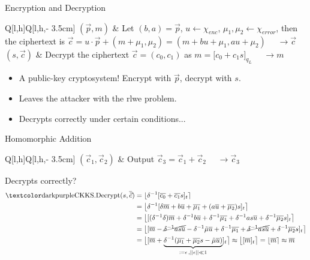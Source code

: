 \begin{frame}{Encryption and Decryption}
   \\
  \begin{tblr}{Q[l,h]Q[l,h,\textwidth - 3.5cm]}
    $(\vec{p}, m)$ & {
        Let $(b,a) = \vec{p}$, $u \leftarrow \chi_{enc}$, $\mu_1, \mu_2 \leftarrow \chi_{error}$,
        then the ciphertext is $\vec{c} = u \cdot \vec{p} + (m + \mu_1, \mu_2) = (m + bu + \mu_1, au + \mu_2)$
        $\quad\rightarrow \vec{c}$} \\
    $(s, \vec{c})$ & {
        Decrypt the ciphertext $\vec{c} = (c_0, c_1)$ as $m = \lbrack c_0 + c_1 s\rbrack_{q_L}$
        $\quad\rightarrow m$} \\
  \end{tblr}
  \begin{itemize}
    \item A public-key cryptosystem! Encrypt with $\vec{p}$, decrypt with $s$.
    \item Leaves the attacker with the \gls{rlwe} problem.
    \item Decrypts correctly under certain conditions...
  \end{itemize}
\end{frame}

\begin{frame}{Homomorphic Addition}
  \begin{tblr}{Q[l,h]Q[l,h,\textwidth - 3.5cm]}
    $(\vec{c}_1, \vec{c}_2)$ & {
        Output $\vec{c}_3 = \vec{c}_1 + \vec{c}_2$
        $\quad\rightarrow \vec{c}_3$} \\
  \end{tblr}

  Decrypts correctly?
  \begin{align*}
    \cryptop{CKKS.Decrypt}(s, \overline{\vec{c}})
     & = \lfloor \delta\inv [\overline{c_0} + \overline{c_1} s]_t \rceil                                                                                                                                                         \\
     & = \big\lfloor \delta\inv [\delta \overline{m} + b \overline{u} + \overline{\mu_1} + (a \overline{u} + \overline{\mu_2}) s]_t \big\rceil                                                                                   \\
     & = \big\lfloor [(\delta\inv\delta) \overline{m} + \delta\inv b \overline{u} + \delta\inv \overline{\mu_1} + \delta\inv a s \overline{u} + \delta\inv \overline{\mu_2} s]_t \big\rceil                                      \\
     & = \big\lfloor [\overline{m} - \cancel{\delta\inv as \overline{u}} - \delta\inv \tilde{\mu} \overline{u} + \delta\inv \overline{\mu_1} + \cancel{\delta\inv as \overline{u}} + \delta\inv \overline{\mu_2} s]_t \big\rceil \\
     & = \big\lfloor [\overline{m} + \underbrace{\delta\inv (\overline{\mu_1} + \overline{\mu_2} s - \tilde{\mu} \overline{u})}_{:= \epsilon \,, ||\epsilon|| \ll 1}]_t \big\rceil
    \approx \big\lfloor [\overline{m}]_t \big\rceil = \lfloor \overline{m} \rceil \approx \overline{m}
  \end{align*}
\end{frame}
